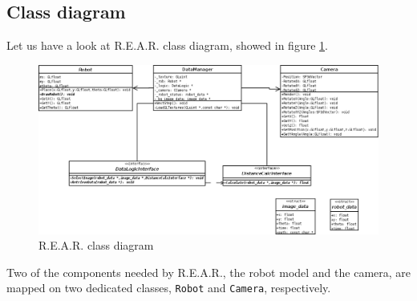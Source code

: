 %
%

%


%
%
\subsection{Class diagram}
%
Let us have a look at \textsf{R.E.A.R.} class diagram, 
showed in figure \ref {fig:class_diagram}.
%
\begin{figure}[!h]
  \begin{center}
    \includegraphics[width=400pt]{img/rear_class_diagram.png}
    \caption{\textsf{R.E.A.R.} class diagram}
    \label{fig:class_diagram}
  \end{center}
\end{figure}
%
Two of the components needed by \textsf{R.E.A.R.}, the robot 
model and the camera, are mapped on two dedicated classes, 
\texttt{Robot} and \texttt{Camera}, respectively.
%

